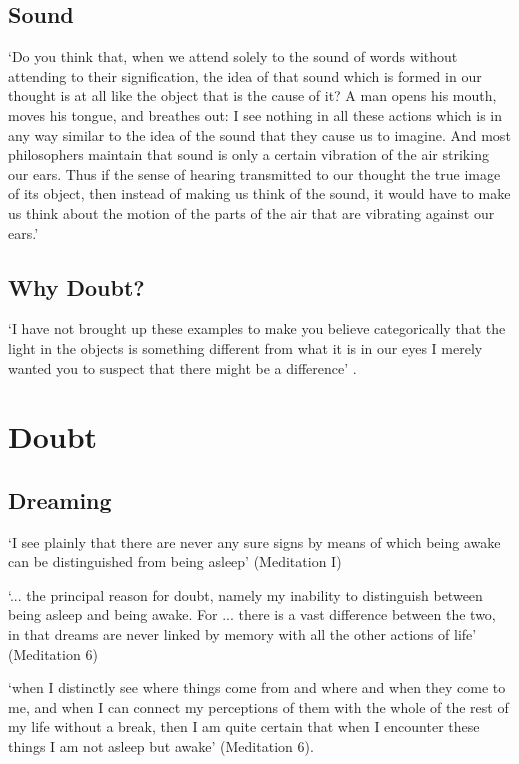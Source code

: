 \documentclass[12pt]{extarticle}
\begin{document}
\begin{multicols*}{3}
\subsection{Sound}
‘Do you think that, when we attend solely to the sound of words without attending to their
signification, the idea of that sound which is formed in our thought is at all like the object that
is the cause of it?
A man opens his mouth, moves his tongue, and breathes out:
I see nothing in all
these actions which is in any way similar to the idea of the sound that they cause us to imagine.
And most philosophers maintain that sound is only a certain vibration of the air striking our ears.
Thus if the sense of hearing transmitted to our thought the true image of its object, then instead
of making us think of the sound, it would have to make us think about the motion of the parts of the
air that are vibrating against our ears.’
\citep[][p. 4--5 (AT IX:5)]{descartes:1998_world}
 
 
\subsection{Why Doubt?}
‘I have not brought up these examples to make you believe categorically that the light in the objects
is something different from what it is in our eyes
I merely wanted you to suspect that there might be a difference’
\citep[][p.~82 (AT XI:6)]{descartes:1998_world}.


\section{Doubt}

\subsection{Dreaming}
‘I see plainly that there are never any sure signs by means of which 
being awake can be distinguished from being asleep’ (Meditation I)

‘... the principal reason for doubt, namely my inability to distinguish 
between being asleep and being awake. 
For ... there is a vast difference between the two, in that dreams are 
never linked by memory with all the other actions of life’ (Meditation 6)

‘when I distinctly see where things come from and where and 
when they come to me, and when I can connect my perceptions of them with 
the whole of the rest of my life without a break, 
then I am quite certain that when I encounter these things 
I am not asleep but awake’ (Meditation 6).


\end{multicols*}
\end{document}
